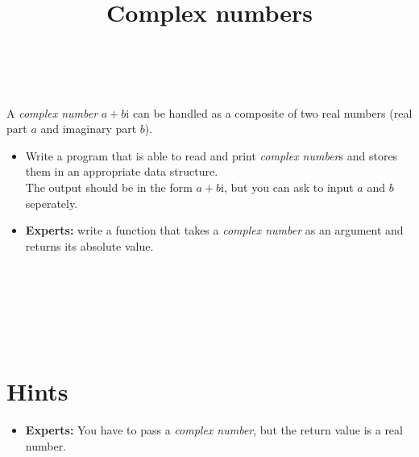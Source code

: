

\title{Complex numbers} %
\author{} %
\renewcommand{\difficulty}{Medium} %
\renewcommand{\requirements}{Complex data types} %
\renewcommand{\aims}{Working with structs} %


 \maketitle
 \taskinfos

\ \\\ \\

A \textit{complex number} $a + b\mathrm{i}$ can be handled as a composite of two real numbers (real part $a$ and imaginary part $b$).
\begin{itemize}
	\item Write a program that is able to read and print \textit{complex number}s and stores them in an appropriate data structure.
	\\ The output should be in the form $a + b\mathrm{i}$, but you can ask to input $a$ and $b$ seperately.
	\item \textbf{Experts:} write a function that takes a \textit{complex number} as an argument and returns its absolute value.
\end{itemize}	
 
 
\ \\\ \\\ \\\ \\\ \\
\section*{Hints}
	\begin{itemize}
		\item \textbf{Experts:} You have to pass a \textit{complex number}, but the return value is a real number.
	\end{itemize}
 

